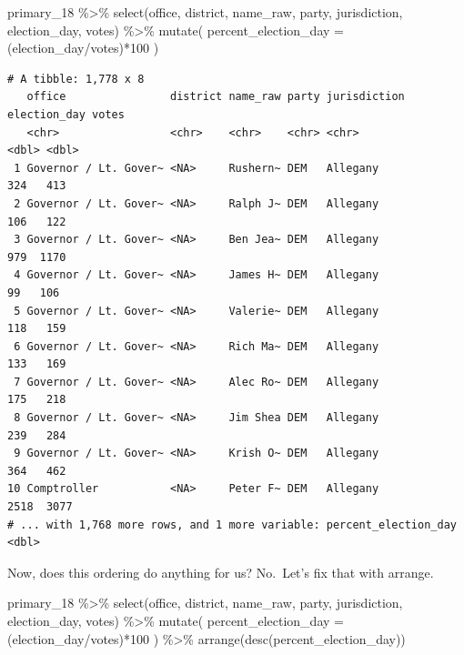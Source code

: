 \documentclass[
  letterpaper,
  DIV=11,
  numbers=noendperiod]{scrreprt}
\newenvironment{Shaded}{\begin{snugshade}}{\end{snugshade}}
\newcommand{\AttributeTok}[1]{\textcolor[rgb]{0.40,0.45,0.13}{#1}}
\newcommand{\DecValTok}[1]{\textcolor[rgb]{0.68,0.00,0.00}{#1}}
\newcommand{\FunctionTok}[1]{\textcolor[rgb]{0.28,0.35,0.67}{#1}}
\newcommand{\NormalTok}[1]{\textcolor[rgb]{0.00,0.23,0.31}{#1}}
\newcommand{\SpecialCharTok}[1]{\textcolor[rgb]{0.37,0.37,0.37}{#1}}
\begin{document}
\begin{Shaded}
\begin{Highlighting}[]
\NormalTok{primary\_18 }\SpecialCharTok{\%\textgreater{}\%}
  \FunctionTok{select}\NormalTok{(office, district, name\_raw, party, jurisdiction, election\_day, votes) }\SpecialCharTok{\%\textgreater{}\%} 
  \FunctionTok{mutate}\NormalTok{(}
  \AttributeTok{percent\_election\_day =}\NormalTok{ (election\_day}\SpecialCharTok{/}\NormalTok{votes)}\SpecialCharTok{*}\DecValTok{100}
\NormalTok{)}
\end{Highlighting}
\end{Shaded}

\begin{verbatim}
# A tibble: 1,778 x 8
   office                district name_raw party jurisdiction election_day votes
   <chr>                 <chr>    <chr>    <chr> <chr>               <dbl> <dbl>
 1 Governor / Lt. Gover~ <NA>     Rushern~ DEM   Allegany              324   413
 2 Governor / Lt. Gover~ <NA>     Ralph J~ DEM   Allegany              106   122
 3 Governor / Lt. Gover~ <NA>     Ben Jea~ DEM   Allegany              979  1170
 4 Governor / Lt. Gover~ <NA>     James H~ DEM   Allegany               99   106
 5 Governor / Lt. Gover~ <NA>     Valerie~ DEM   Allegany              118   159
 6 Governor / Lt. Gover~ <NA>     Rich Ma~ DEM   Allegany              133   169
 7 Governor / Lt. Gover~ <NA>     Alec Ro~ DEM   Allegany              175   218
 8 Governor / Lt. Gover~ <NA>     Jim Shea DEM   Allegany              239   284
 9 Governor / Lt. Gover~ <NA>     Krish O~ DEM   Allegany              364   462
10 Comptroller           <NA>     Peter F~ DEM   Allegany             2518  3077
# ... with 1,768 more rows, and 1 more variable: percent_election_day <dbl>
\end{verbatim}

Now, does this ordering do anything for us? No.~Let's fix that with
arrange.

\begin{Shaded}
\begin{Highlighting}[]
\NormalTok{primary\_18 }\SpecialCharTok{\%\textgreater{}\%}
  \FunctionTok{select}\NormalTok{(office, district, name\_raw, party, jurisdiction, election\_day, votes) }\SpecialCharTok{\%\textgreater{}\%} 
  \FunctionTok{mutate}\NormalTok{(}
  \AttributeTok{percent\_election\_day =}\NormalTok{ (election\_day}\SpecialCharTok{/}\NormalTok{votes)}\SpecialCharTok{*}\DecValTok{100}
\NormalTok{)  }\SpecialCharTok{\%\textgreater{}\%} \FunctionTok{arrange}\NormalTok{(}\FunctionTok{desc}\NormalTok{(percent\_election\_day))}
\end{Highlighting}
\end{Shaded}
\end{document}

